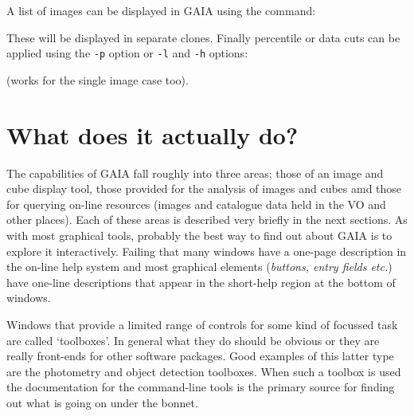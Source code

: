 \documentclass[twoside,11pt,nolof]{starlink}
\providecommand{\mytt}[1]{{\texttt{#1}}}
\begin{document}
A list of images can be displayed in GAIA using the command:
\begin{terminalv}
\end{terminalv}
These will be displayed in separate clones. Finally percentile or
data cuts can be applied using the \mytt{-p} option or \mytt{-l} and
\mytt{-h} options:
\begin{terminalv}

\end{terminalv}
(works for the single image case too).

\section{What does it actually do?}

The capabilities of GAIA fall roughly into three areas; those of an
image and cube display tool, those provided for the analysis of images
and cubes amd those for querying on-line resources (images and catalogue
data held in the VO and other places). Each of these areas is described
very briefly in the next sections. As with most graphical tools,
probably the best way to find out about GAIA is to explore it
interactively. Failing that many windows have a one-page description in
the on-line help system and most graphical elements (\textit{buttons,
entry fields etc.}) have one-line descriptions that appear in the
short-help region at the bottom of windows.

Windows that provide a limited range of controls for some kind of
focussed task are called `toolboxes'. In general what they do should
be obvious or they are really front-ends for other software
packages. Good examples of this latter type are the photometry and
object detection toolboxes. When such a toolbox is used the
documentation for the command-line tools is the primary source for
finding out what is going on under the bonnet.
\end{document}

